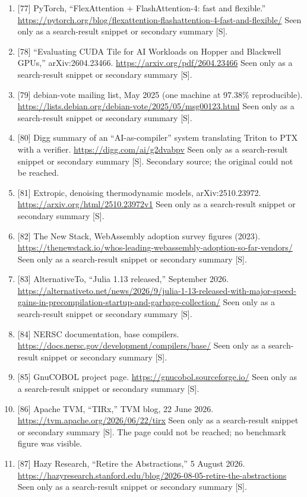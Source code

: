 \documentclass[10pt,letterpaper]{article}
\begin{document}
\begin{enumerate}
  Seen only as a search-result snippet or secondary summary {[}S{]}.
\item
  {[}77{]} PyTorch, ``FlexAttention + FlashAttention-4: fast and
  flexible.''
  \url{https://pytorch.org/blog/flexattention-flashattention-4-fast-and-flexible/}
  Seen only as a search-result snippet or secondary summary {[}S{]}.
\item
  {[}78{]} ``Evaluating CUDA Tile for AI Workloads on Hopper and
  Blackwell GPUs,'' arXiv:2604.23466.
  \url{https://arxiv.org/pdf/2604.23466} Seen only as a search-result
  snippet or secondary summary {[}S{]}.
\item
  {[}79{]} debian-vote mailing list, May 2025 (one machine at 97.38\%
  reproducible).
  \url{https://lists.debian.org/debian-vote/2025/05/msg00123.html} Seen
  only as a search-result snippet or secondary summary {[}S{]}.
\item
  {[}80{]} Digg summary of an ``AI-as-compiler'' system translating
  Triton to PTX with a verifier. \url{https://digg.com/ai/g2dvabpv} Seen
  only as a search-result snippet or secondary summary {[}S{]}.
  Secondary source; the original could not be reached.
\item
  {[}81{]} Extropic, denoising thermodynamic models, arXiv:2510.23972.
  \url{https://arxiv.org/html/2510.23972v1} Seen only as a search-result
  snippet or secondary summary {[}S{]}.
\item
  {[}82{]} The New Stack, WebAssembly adoption survey figures (2023).
  \url{https://thenewstack.io/whos-leading-webassembly-adoption-so-far-vendors/}
  Seen only as a search-result snippet or secondary summary {[}S{]}.
\item
  {[}83{]} AlternativeTo, ``Julia 1.13 released,'' September 2026.
  \url{https://alternativeto.net/news/2026/9/julia-1-13-released-with-major-speed-gains-in-precompilation-startup-and-garbage-collection/}
  Seen only as a search-result snippet or secondary summary {[}S{]}.
\item
  {[}84{]} NERSC documentation, base compilers.
  \url{https://docs.nersc.gov/development/compilers/base/} Seen only as
  a search-result snippet or secondary summary {[}S{]}.
\item
  {[}85{]} GnuCOBOL project page. \url{https://gnucobol.sourceforge.io/}
  Seen only as a search-result snippet or secondary summary {[}S{]}.
\item
  {[}86{]} Apache TVM, ``TIRx,'' TVM blog, 22 June 2026.
  \url{https://tvm.apache.org/2026/06/22/tirx} Seen only as a
  search-result snippet or secondary summary {[}S{]}. The page could not
  be reached; no benchmark figure was visible.
\item
  {[}87{]} Hazy Research, ``Retire the Abstractions,'' 5 August 2026.
  \url{https://hazyresearch.stanford.edu/blog/2026-08-05-retire-the-abstractions}
  Seen only as a search-result snippet or secondary summary {[}S{]}.
\end{enumerate}
\end{document}
